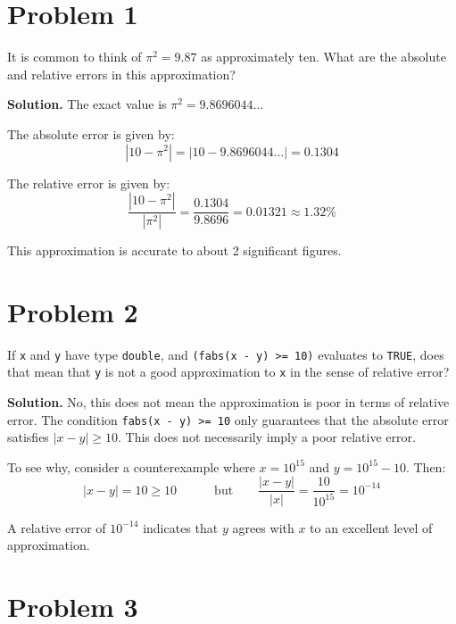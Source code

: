 \documentclass[letterpaper, 11pt]{article}
\newcommand{\1}{\mathds{1}}	%
\theoremstyle{definition}
\begin{document}
\section*{Problem 1}

It is common to think of $\pi^2 = 9.87$ as approximately ten. What are the absolute and relative errors in this approximation?

\medskip

\textbf{Solution.} The exact value is $\pi^2 = 9.8696044\ldots$

The absolute error is given by:
\[
|10 - \pi^2| = |10 - 9.8696044\ldots| = 0.1304
\]

The relative error is given by:
\[
\frac{|10 - \pi^2|}{|\pi^2|} = \frac{0.1304}{9.8696} = 0.01321 \approx 1.32\%
\]

This approximation is accurate to about 2 significant figures.

\section*{Problem 2}

If \texttt{x} and \texttt{y} have type \texttt{double}, and \texttt{(fabs(x - y) >= 10)} evaluates to \texttt{TRUE}, does that mean that \texttt{y} is not a good approximation to \texttt{x} in the sense of relative error?

\medskip

\textbf{Solution.} No, this does not mean the approximation is poor in terms of relative error. The condition \texttt{fabs(x - y) >= 10} only guarantees that the absolute error satisfies $|x-y| \geq 10$. This does not necessarily imply a poor relative error.

To see why, consider a counterexample where $x = 10^{15}$ and $y = 10^{15} - 10$. Then:
\[
|x - y| = 10 \geq 10 \quad \qquad \text{but} \qquad \frac{|x-y|}{|x|} = \frac{10}{10^{15}} = 10^{-14}
\]

A relative error of $10^{-14}$ indicates that $y$ agrees with $x$ to an excellent level of approximation.

\section*{Problem 3}
\end{document}
